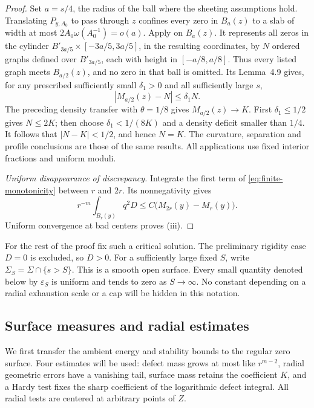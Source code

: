 \begin{proof}
Set \(a=s/4\), the radius of the ball where the sheeting assumptions
hold.  Translating \(P_{y,A_0}\) to pass through \(z\) confines every
zero in \(B_a(z)\) to a slab of width at most
\(2A_0\omega(A_0^{-1})=o(a)\).
Apply \cite[Theorem~4.8]{FSS2025} on \(B_a(z)\).
It represents all zeros in the cylinder
\(B'_{3a/5}\times[-3a/5,3a/5]\), in the resulting coordinates,
by \(N\) ordered graphs defined over \(B'_{3a/5}\), each with
height in \([-a/8,a/8]\).  Thus every listed graph meets
\(B_{a/2}(z)\), and no zero in that ball is omitted.
Its Lemma~4.9 gives, for any prescribed sufficiently small
\(\delta_1>0\) and all sufficiently large \(s\),
\[
 |M_{a/2}(z)-N|\le\delta_1N.
\]
The preceding density transfer with \(\theta=1/8\) gives
\(M_{a/2}(z)\to K\).  First \(\delta_1\le1/2\) gives
\(N\le2K\); then choose \(\delta_1<1/(8K)\) and a density
deficit smaller than \(1/4\).  It follows that
\(|N-K|<1/2\), and hence \(N=K\).
The curvature, separation and profile conclusions are those of the
same results.  All applications use fixed interior fractions and
uniform moduli.

\emph{Uniform disappearance of discrepancy.}
Integrate the first term of \eqref{eq:finite-monotonicity}
between \(r\) and \(2r\).  Its nonnegativity gives
\[
 r^{-m}\int_{B_r(y)}q^2D
 \le C\bigl(M_{2r}(y)-M_r(y)\bigr).
\]
Uniform convergence at bad centers proves (iii).
\end{proof}

For the rest of the proof fix such a critical solution.  The preliminary
rigidity case \(D=0\) is excluded, so \(D>0\).
For a sufficiently large fixed \(S\), write
\(\Sigma_S=\Sigma\cap\{s>S\}\).  This is a smooth open surface.
Every small quantity denoted below by \(\varepsilon_S\) is uniform and
tends to zero as \(S\to\infty\).  No constant depending on a radial
exhaustion scale or a cap will be hidden in this notation.

\subsection{Surface measures and radial estimates}

We first transfer the ambient energy and stability bounds to the regular
zero surface.  Four estimates will be used: defect mass grows at most
like \(r^{m-2}\), radial geometric errors have a vanishing tail, surface
mass retains the coefficient \(K\), and a Hardy test fixes the sharp
coefficient of the logarithmic defect integral.  All radial tests are
centered at arbitrary points of \(Z\).

